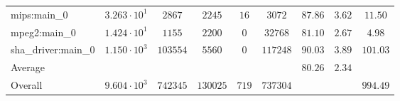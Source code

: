 \begin{tabular}{|l|c|c|c|c|c|c|c|c|}
mips:main\_0            & $ 3.263 \cdot 10^{1} $ & $ 2867   $ & $ 2245   $ & $ 16  $ & $ 3072   $ & $ 87.86       $ & $ 3.62    $ & $ 11.50   $ \\
mpeg2:main\_0           & $ 1.424 \cdot 10^{1} $ & $ 1155   $ & $ 2200   $ & $ 0   $ & $ 32768  $ & $ 81.10       $ & $ 2.67    $ & $ 4.98    $ \\
sha\_driver:main\_0     & $ 1.150 \cdot 10^{3} $ & $ 103554 $ & $ 5560   $ & $ 0   $ & $ 117248 $ & $ 90.03       $ & $ 3.89    $ & $ 101.03  $ \\
\hline
Average                 & $                    $ & $        $ & $        $ & $     $ & $        $ & $ 80.26       $ & $ 2.34    $ & $         $ \\
\hline
Overall                 & $ 9.604 \cdot 10^{3} $ & $ 742345 $ & $ 130025 $ & $ 719 $ & $ 737304 $ & $             $ & $         $ & $ 994.49  $ \\
\hline
\end{tabular}
